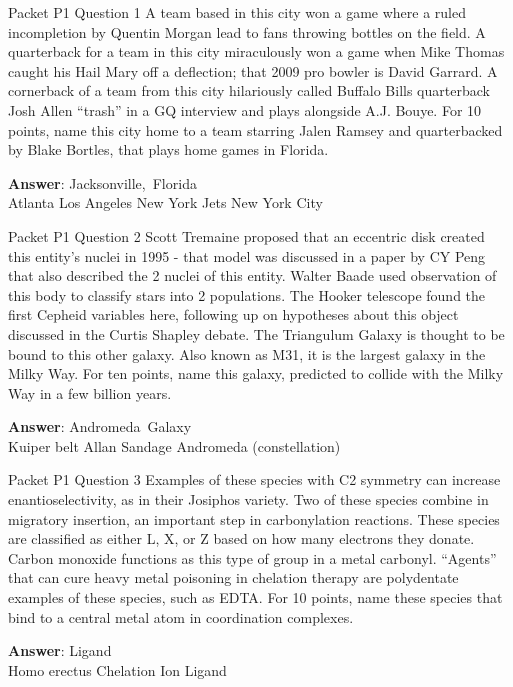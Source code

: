 \begin{frame}{Packet P1 Question 1}
A team based in this city won a game where a ruled incompletion by Quentin Morgan lead to fans throwing bottles on the field. A quarterback for a team in this city miraculously won a game when Mike Thomas caught his Hail Mary off a deflection; that 2009 pro bowler is David Garrard. A cornerback of a team from this city hilariously called Buffalo Bills quarterback Josh Allen “trash” in a GQ interview and plays alongside A.J. Bouye. For 10 points, name this city home to a team starring Jalen Ramsey and quarterbacked by Blake Bortles, that plays home games in Florida.        

\textbf{Answer}: Jacksonville,\ Florida\\
 Atlanta
 Los Angeles
 New York Jets
 New York City
\end{frame}

\begin{frame}{Packet P1 Question 2}
Scott Tremaine proposed   that an eccentric disk created this entity's nuclei in 1995 - that model was discussed in a paper by CY Peng that also described the 2 nuclei of this entity. Walter Baade used observation of this body to classify stars into 2 populations.   The Hooker telescope found the first Cepheid variables here,     following up on hypotheses about this object discussed in the Curtis Shapley debate. The Triangulum Galaxy is thought to be bound to this other galaxy. Also known   as M31, it is the   largest galaxy in the Milky Way. For   ten points, name this galaxy, predicted to collide with the Milky Way in a few billion years.

\textbf{Answer}: Andromeda\ Galaxy\\
 Kuiper belt
 Allan Sandage
 Andromeda (constellation)
\end{frame}

\begin{frame}{Packet P1 Question 3}
Examples of these species with C2 symmetry can increase enantioselectivity,   as in their Josiphos variety. Two of these species combine in migratory insertion, an important step in carbonylation reactions. These species are classified as either L, X, or Z based on how many electrons they donate. Carbon monoxide functions as this type of group in a metal carbonyl. ``Agents'' that can cure heavy metal poisoning in chelation therapy are polydentate examples of these     species, such as EDTA. For 10 points, name these species that bind to a central metal atom in coordination complexes.  

\textbf{Answer}: Ligand\\
 Homo erectus
 Chelation
 Ion
 Ligand
\end{frame}

